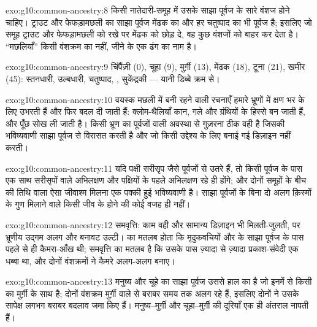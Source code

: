 \begin{solution}{exo:g10:common-ancestry:8}
किसी नातेदारी-समूह में उसके साझा पूर्वज के सारे वंशज होने चाहिए। ट्राउट
और फेफड़ामछली का साझा पूर्वज मेंढक का और हर चतुष्पाद का भी पूर्वज है;
इसलिए जो समूह ट्राउट और फेफड़ामछली को रखे पर मेंढक को छोड़ दे, वह कुछ
वंशजों को बाहर कर देता है। ``मछलियाँ'' किसी वंशक्रम का नहीं, जीने के एक
ढंग का नाम है।
\end{solution}

\begin{solution}{exo:g10:common-ancestry:9}
चिंपैंज़ी (0), चूहा (9), मुर्ग़ी (13), मेंढक (18), टूना (21), खमीर
(45): स्तनधारी, उल्बधारी, चतुष्पाद, , सुकेंद्रकी --- यानी डिब्बे
क्रम से।
\end{solution}

\begin{solution}{exo:g10:common-ancestry:10}
वयस्क मछली में बनी रहने वाली रचनाएँ हमारे भ्रूणों में क्षण भर के लिए
उभरती हैं और फिर बदल दी जाती हैं: क्लोम-थैलियाँ कान, गले और ग्रंथियों के
हिस्से बन जाती हैं, और पूँछ सोख ली जाती है। किसी भ्रूण का पूर्वजों वाली
अवस्था से गुज़रना ठीक वही है जिसकी भविष्यवाणी साझा पूर्वज से विरासत करती
है और जो किसी उद्देश्य के लिए बनाई गई डिज़ाइन नहीं करती।
\end{solution}

\begin{solution}{exo:g10:common-ancestry:11}
यदि पक्षी सरीसृप जैसे पूर्वजों से उतरे हैं, तो किसी पूर्वज के पास एक साथ
सरीसृपों वाले अभिलक्षण और पक्षियों के पहले अभिलक्षण रहे ही होंगे; और
दोनों समूहों के बीच की तिथि वाला ऐसा जीवाश्म मिलना एक पक्की हुई
भविष्यवाणी है। साझा पूर्वजों के बिना दो अलग क़िस्मों के गुण मिलाने वाले
किसी जीव के होने की कोई वजह ही नहीं।
\end{solution}

\begin{solution}{exo:g10:common-ancestry:12}
समवृत्ति: काम वही और सामान्य डिज़ाइन भी मिलती-जुलती, पर भ्रूणीय उद्गम
अलग और बनावट उल्टी।  का मतलब होता कि मृदुकवचियों और  के
साझा पूर्वज के पास पहले से ही कैमरा-आँख थी; समवृत्ति का मतलब है कि उसके
पास ज़्यादा से ज़्यादा प्रकाश-संवेदी एक धब्बा था, और दोनों वंशक्रमों ने
कैमरे अलग-अलग बनाए।
\end{solution}

\begin{solution}{exo:g10:common-ancestry:13}
मनुष्य और चूहे का साझा पूर्वज उससे हाल का है जो इनमें से किसी का
मुर्ग़ी के साथ है; दोनों वंशक्रम मुर्ग़ी वाले से बराबर समय तक अलग रहे
हैं, इसलिए दोनों ने उसके सापेक्ष लगभग बराबर बदलाव जमा किए हैं।
मनुष्य--मुर्ग़ी और चूहा--मुर्ग़ी की दूरियाँ एक ही अंतराल नापती हैं।
\end{solution}


